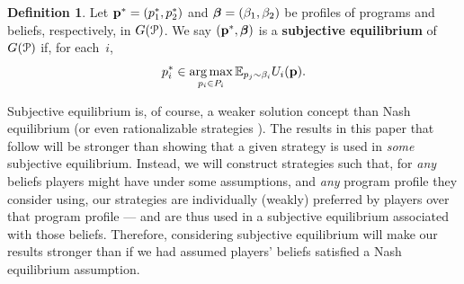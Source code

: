 \documentclass[sigconf]{aamas}
\theoremstyle{definition}
\newtheorem{definition}{Definition} %
\begin{document}
\begin{definition}%
Let
$\textbf{p}^* = (p_1^*, p_2^*)$
and $\boldsymbol{\beta} = (\beta_1, \beta_2)$
be profiles of
programs
and beliefs, respectively, in 
$G(\mathcal{P})$.
We say
$(\textbf{p}^*, \boldsymbol{\beta})$
is a \textbf{subjective equilibrium} of
$G(\mathcal{P})$ %
if, for each~$i$,
$$p_i^* \in \operatorname*{arg\,max}_{p_i \in P_i}
\mathbb{E}_{p_j \sim \beta_i} U_i(\textbf{p}).$$
\end{definition}

Subjective equilibrium is, of course,
a weaker solution concept than Nash equilibrium
(or even rationalizable strategies \citep{Bernheim1984,Pearce1984}).
The results in this paper that follow
will be stronger than showing that a given
strategy is used in \textit{some} subjective equilibrium.
Instead, we will construct strategies such that,
for \textit{any} beliefs players might have under some assumptions,
and \textit{any} program profile they consider using,
our strategies are individually
(weakly) preferred by players over that program profile
---
and are thus used in a subjective equilibrium
associated with those beliefs. Therefore,
considering subjective equilibrium
will make our results stronger
than if we had assumed players'
beliefs satisfied a Nash equilibrium assumption.
\end{document}

